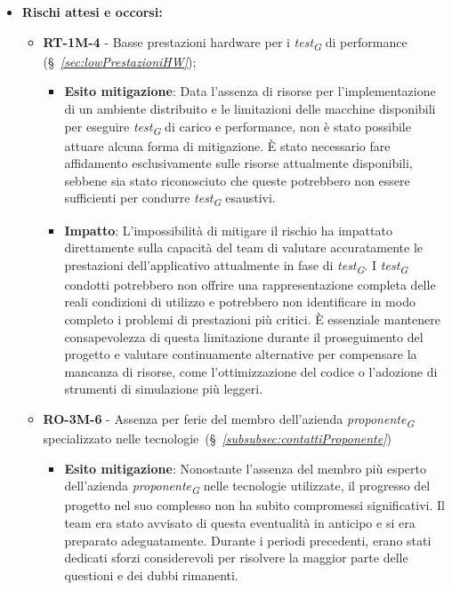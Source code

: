 \begin{itemize}
    \item \textbf{Rischi attesi e occorsi:}
        \begin{itemize}
            \item \textbf{RT-1M-4} - Basse prestazioni hardware per i \textit{test}\textsubscript{\textit{G}} di performance (\S~\textit{\ref{sec:lowPrestazioniHW}});
            \begin{itemize}
                \item \textbf{Esito mitigazione}: Data l'assenza di risorse per l'implementazione di un ambiente distribuito e le limitazioni delle macchine disponibili per eseguire \textit{test}\textsubscript{\textit{G}} di carico e performance, non è stato possibile attuare alcuna forma di mitigazione. È stato necessario fare affidamento esclusivamente sulle risorse attualmente disponibili, sebbene sia stato riconosciuto che queste potrebbero non essere sufficienti per condurre \textit{test}\textsubscript{\textit{G}} esaustivi.
                \item \textbf{Impatto}: L'impossibilità di mitigare il rischio ha impattato direttamente sulla capacità del team di valutare accuratamente le prestazioni dell'applicativo attualmente in fase di \textit{test}\textsubscript{\textit{G}}. I \textit{test}\textsubscript{\textit{G}} condotti potrebbero non offrire una rappresentazione completa delle reali condizioni di utilizzo e potrebbero non identificare in modo completo i problemi di prestazioni più critici. È essenziale mantenere consapevolezza di questa limitazione durante il proseguimento del progetto e valutare continuamente alternative per compensare la mancanza di risorse, come l'ottimizzazione del codice o l'adozione di strumenti di simulazione più leggeri.
            \end{itemize}
            \item \textbf{RO-3M-6} - Assenza per ferie del membro dell'azienda \textit{proponente}\textsubscript{\textit{G}} specializzato nelle tecnologie~(\S~\textit{\ref{subsubsec:contattiProponente}})
                \begin{itemize}
                    \item \textbf{Esito mitigazione}: Nonostante l'assenza del membro più esperto dell'azienda \textit{proponente}\textsubscript{\textit{G}} nelle tecnologie utilizzate, il progresso del progetto nel suo complesso non ha subito compromessi significativi. Il team era stato avvisato di questa eventualità in anticipo e si era preparato adeguatamente. Durante i periodi precedenti, erano stati dedicati sforzi considerevoli per risolvere la maggior parte delle questioni e dei dubbi rimanenti.

\end{itemize}
\end{itemize}
\end{itemize}
